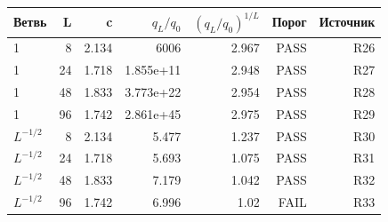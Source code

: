 \begin{tabular}{lrrrrrr}
\toprule
Ветвь & L & c & $q_L/q_0$ & $(q_L/q_0)^{1/L}$ & Порог & Источник \\
\midrule
1 & 8 & 2.134 & 6006 & 2.967 & PASS & R26 \\
1 & 24 & 1.718 & 1.855e+11 & 2.948 & PASS & R27 \\
1 & 48 & 1.833 & 3.773e+22 & 2.954 & PASS & R28 \\
1 & 96 & 1.742 & 2.861e+45 & 2.975 & PASS & R29 \\
$L^{-1/2}$ & 8 & 2.134 & 5.477 & 1.237 & PASS & R30 \\
$L^{-1/2}$ & 24 & 1.718 & 5.693 & 1.075 & PASS & R31 \\
$L^{-1/2}$ & 48 & 1.833 & 7.179 & 1.042 & PASS & R32 \\
$L^{-1/2}$ & 96 & 1.742 & 6.996 & 1.02 & FAIL & R33 \\
\bottomrule
\end{tabular}